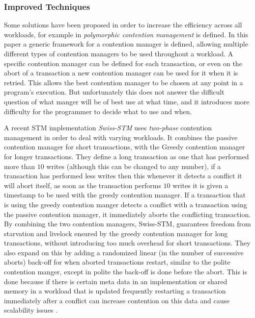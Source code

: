 \subsubsection{Improved Techniques}
Some solutions have been proposed in order to increase the efficiency across all workloads, for example in \cite{guerraoui05polymorphic/LPD} \emph{polymorphic contention management} is defined.
In this paper a generic framework for a contention manager is defined, allowing multiple different types of contention managers to be used throughout a workload.
A specific contention manager can be defined for each transaction, or even on the abort of a transaction a new contention manager can be used for it when it is retried.
This allows the best contention manager to be chosen at any point in a program's execution.
But unfortunately this does not answer the difficult question of what manger will be of best use at what time, and it introduces more difficulty for the programmer to decide what to use and when.

A recent STM implementation \emph{Swiss-STM} \cite{1542494} uses \emph{two-phase} contention management in order to deal with varying workloads.
It combines the passive contention manager for short transactions, with the Greedy contention manager for longer transactions.
They define a long transaction as one that has performed more than $10$ writes (although this can be changed to any number), if a transaction has performed less writes then this whenever it detects a conflict it will abort itself, as soon as the transaction performs $10$ writes it is given a timestamp to be used with the greedy contention manager.
If a transaction that is using the greedy contention manger detects a conflict with a transaction using the passive contention manager, it immediately aborts the conflicting transaction.
By combining the two contention managers, Swiss-STM, guarantees freedom from starvation and livelock ensured by the greedy contention manager for long transactions, without introducing too much overhead for short transactions.
They also expand on this by adding a randomized linear (in the number of successive aborts) back-off for when aborted transactions restart, similar to the polite contention manger, except in polite the back-off is done before the abort.
This is done because if there is certain meta data in an implementation or shared memory in a workload that is updated frequently restarting a transaction immediately after a conflict can increase contention on this data and cause scalability issues \cite{lev:anatomy:transact:2009}. 

